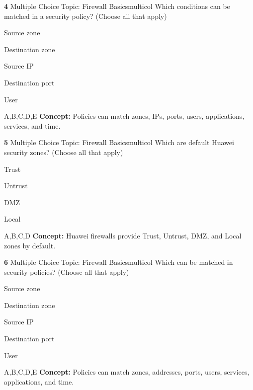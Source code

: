 \documentclass[10pt,a4paper]{article}
\begin{document}
\begin{qcard}{\color{white}\textbf{4} \hfill \small Multiple Choice \textbar{} Topic: Firewall Basics}{multicol}
Which conditions can be matched in a security policy? (Choose all that apply)

\begin{qoptions}
\item Source zone
\item Destination zone
\item Source IP
\item Destination port
\item User
\end{qoptions}
\begin{explainbox}{A,B,C,D,E}
\textbf{Concept:} Policies can match zones, IPs, ports, users, applications, services, and time.
\end{explainbox}
\end{qcard}

\begin{qcard}{\color{white}\textbf{5} \hfill \small Multiple Choice \textbar{} Topic: Firewall Basics}{multicol}
Which are default Huawei security zones? (Choose all that apply)

\begin{qoptions}
\item Trust
\item Untrust
\item DMZ
\item Local
\end{qoptions}
\begin{explainbox}{A,B,C,D}
\textbf{Concept:} Huawei firewalls provide Trust, Untrust, DMZ, and Local zones by default.
\end{explainbox}
\end{qcard}

\begin{qcard}{\color{white}\textbf{6} \hfill \small Multiple Choice \textbar{} Topic: Firewall Basics}{multicol}
Which can be matched in security policies? (Choose all that apply)

\begin{qoptions}
\item Source zone
\item Destination zone
\item Source IP
\item Destination port
\item User
\end{qoptions}
\begin{explainbox}{A,B,C,D,E}
\textbf{Concept:} Policies can match zones, addresses, ports, users, services, applications, and time.
\end{explainbox}
\end{qcard}
\end{document}
